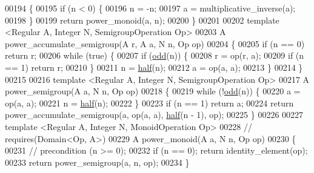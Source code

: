 \begin{DoxyCode}
00194 \{
00195   \textcolor{keywordflow}{if} (n < 0) \{
00196     n = -n;
00197     a = multiplicative\_inverse(a);
00198   \}
00199   \textcolor{keywordflow}{return} power\_monoid(a, n);
00200 \}
00201 
00202 \textcolor{keyword}{template} <Regular A, Integer N, SemigroupOperation Op>
00203 A power\_accumulate\_semigroup(A r, A a, N n, Op op)
00204 \{
00205   \textcolor{keywordflow}{if} (n == 0) \textcolor{keywordflow}{return} r;
00206   \textcolor{keywordflow}{while} (\textcolor{keyword}{true}) \{
00207     \textcolor{keywordflow}{if} (\mbox{\hyperlink{ch07_8hpp_a77588a29d6eeebc52834d05039b7f83f}{odd}}(n)) \{
00208       r = op(r, a);
00209       \textcolor{keywordflow}{if} (n == 1) \textcolor{keywordflow}{return} r;
00210     \}
00211     n = \mbox{\hyperlink{ch07_8hpp_a5c310c077a590421ce629a0a40d6b841}{half}}(n);
00212     a = op(a, a);
00213   \}
00214 \}
00215 
00216 \textcolor{keyword}{template} <Regular A, Integer N, SemigroupOperation Op>
00217 A power\_semigroup(A a, N n, Op op)
00218 \{
00219   \textcolor{keywordflow}{while} (!\mbox{\hyperlink{ch07_8hpp_a77588a29d6eeebc52834d05039b7f83f}{odd}}(n)) \{
00220     a = op(a, a);
00221     n = \mbox{\hyperlink{ch07_8hpp_a5c310c077a590421ce629a0a40d6b841}{half}}(n);
00222   \}
00223   \textcolor{keywordflow}{if} (n == 1) \textcolor{keywordflow}{return} a;
00224   \textcolor{keywordflow}{return} power\_accumulate\_semigroup(a, op(a, a), \mbox{\hyperlink{ch07_8hpp_a5c310c077a590421ce629a0a40d6b841}{half}}(n - 1), op);
00225 \}
00226 
00227 \textcolor{keyword}{template} <Regular A, Integer N, Mono\textcolor{keywordtype}{id}Operation Op>
00228 \textcolor{comment}{// requires(Domain<Op, A>)}
00229 A power\_monoid(A a, N n, Op op)
00230 \{
00231   \textcolor{comment}{// precondition (n >= 0);}
00232   \textcolor{keywordflow}{if} (n == 0); \textcolor{keywordflow}{return} identity\_element(op);
00233   \textcolor{keywordflow}{return} power\_semigroup(a, n, op);
00234 \}
\end{DoxyCode}
